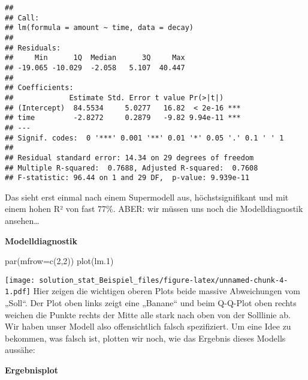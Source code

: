 \documentclass[
]{article}
\newenvironment{Shaded}{\begin{snugshade}}{\end{snugshade}}
\newcommand{\AttributeTok}[1]{\textcolor[rgb]{0.77,0.63,0.00}{#1}}
\newcommand{\DecValTok}[1]{\textcolor[rgb]{0.00,0.00,0.81}{#1}}
\newcommand{\FloatTok}[1]{\textcolor[rgb]{0.00,0.00,0.81}{#1}}
\newcommand{\FunctionTok}[1]{\textcolor[rgb]{0.00,0.00,0.00}{#1}}
\newcommand{\NormalTok}[1]{#1}
\newcommand{\SpecialCharTok}[1]{\textcolor[rgb]{0.00,0.00,0.00}{#1}}
\newcommand{\StringTok}[1]{\textcolor[rgb]{0.31,0.60,0.02}{#1}}
\begin{document}
\begin{verbatim}
## 
## Call:
## lm(formula = amount ~ time, data = decay)
## 
## Residuals:
##     Min      1Q  Median      3Q     Max 
## -19.065 -10.029  -2.058   5.107  40.447 
## 
## Coefficients:
##             Estimate Std. Error t value Pr(>|t|)    
## (Intercept)  84.5534     5.0277   16.82  < 2e-16 ***
## time         -2.8272     0.2879   -9.82 9.94e-11 ***
## ---
## Signif. codes:  0 '***' 0.001 '**' 0.01 '*' 0.05 '.' 0.1 ' ' 1
## 
## Residual standard error: 14.34 on 29 degrees of freedom
## Multiple R-squared:  0.7688, Adjusted R-squared:  0.7608 
## F-statistic: 96.44 on 1 and 29 DF,  p-value: 9.939e-11
\end{verbatim}

Das sieht erst einmal nach einem Supermodell aus, höchstsignifikant und
mit einem hohen R² von fast 77\%. ABER: wir müssen uns noch die
Modelldiagnostik ansehen\ldots{}

\textbf{Modelldiagnostik}

\begin{Shaded}
\begin{Highlighting}[]
\FunctionTok{par}\NormalTok{(}\AttributeTok{mfrow=}\FunctionTok{c}\NormalTok{(}\DecValTok{2}\NormalTok{,}\DecValTok{2}\NormalTok{))}
\FunctionTok{plot}\NormalTok{(lm}\FloatTok{.1}\NormalTok{)}
\end{Highlighting}
\end{Shaded}

\texttt{[image: solution\_stat\_Beispiel\_files/figure-latex/unnamed-chunk-4-1.pdf]}
Hier zeigen die wichtigen oberen Plots beide massive Abweichungen vom
„Soll``. Der Plot oben links zeigt eine „Banane`` und beim Q-Q-Plot oben
rechts weichen die Punkte rechts der Mitte alle stark nach oben von der
Solllinie ab. Wir haben unser Modell also offensichtlich falsch
spezifiziert. Um eine Idee zu bekommen, was falsch ist, plotten wir
noch, wie das Ergebnis dieses Modells aussähe:

\textbf{Ergebnisplot}

\begin{Shaded}
\end{Shaded}
\end{document}
